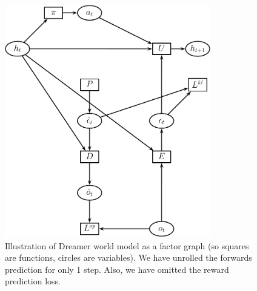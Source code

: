 \begin{figure}
\centering
\includegraphics[height=4in]{figs/dreamer-noval}
\caption{
  Illustration of  Dreamer world model as a factor graph
  (so  squares are functions, circles are variables).
  We have unrolled the forwards prediction for only 1 step.
  Also, we have omitted the reward prediction loss.
}
\label{fig:dreamer}
\end{figure}

\renewcommand{\latent}{\vepsilon}

